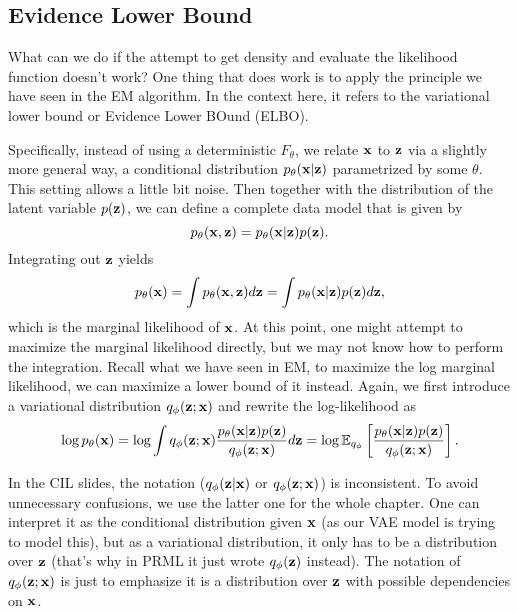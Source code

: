 \documentclass[../main.tex]{subfiles}
\begin{document}
\subsection{Evidence Lower Bound}
What can we do if the attempt to get density and evaluate the likelihood function doesn't work? One thing that does work is to apply the principle we have seen in the EM algorithm. In the context here, it refers to the variational lower bound or Evidence Lower BOund (ELBO). 
\par Specifically, instead of using a deterministic $F_{\theta}$, we relate ${\bf x}$ to ${\bf z}$ via a slightly more general way, a conditional distribution $p_{\theta}({\bf x}|{\bf z})$ parametrized by some $\theta$. This setting allows a little bit noise. Then together with the distribution of the latent variable $p({\bf z})$, we can define a complete data model that is given by
\begin{equation*}
p_{\theta}({\bf x},{\bf z})=p_{\theta}({\bf x}|{\bf z})p({\bf z}).
\end{equation*}
Integrating out ${\bf z}$ yields
\begin{equation*}
p_{\theta}({\bf x})=\int p_{\theta}({\bf x},{\bf z})d{\bf z} = \int p_{\theta}({\bf x}|{\bf z})p({\bf z})d{\bf z},
\end{equation*}
which is the marginal likelihood of ${\bf x}$. At this point, one might attempt to maximize the marginal likelihood directly, but we may not know how to perform the integration. Recall what we have seen in EM, to maximize the log marginal likelihood, we can maximize a lower bound of it instead. Again, we first introduce a variational distribution $q_{\phi}({\bf z};{\bf x})$ and rewrite the log-likelihood as
\begin{equation*}
\log p_{\theta}({\bf x})=\log \int q_{\phi}({\bf z};{\bf x}) \frac{p_{\theta}({\bf x}|{\bf z})p({\bf z})}{q_{\phi}({\bf z};{\bf x})}d{\bf z} = \log \mathbb{E}_{q_{\phi}} \left[\frac{p_{\theta}({\bf x}|{\bf z})p({\bf z})}{q_{\phi}({\bf z};{\bf x})}\right].
\end{equation*}
\begin{remark}
	In the CIL slides, the notation ($q_\phi({\bf z}|{\bf x})$ or $q_\phi({\bf z};{\bf x})$) is inconsistent. To avoid unnecessary confusions, we use the latter one for the whole chapter. One can interpret it as the conditional distribution given ${\bf x}$ (as our VAE model is trying to model this), but as a variational distribution, it only has to be a distribution over ${\bf z}$ (that's why in PRML it just wrote $q_\phi({\bf z})$ instead). The notation of $q_\phi({\bf z};{\bf x})$ is just to emphasize it is a distribution over ${\bf z}$ with possible dependencies on ${\bf x}$.
\end{remark}
\end{document}
